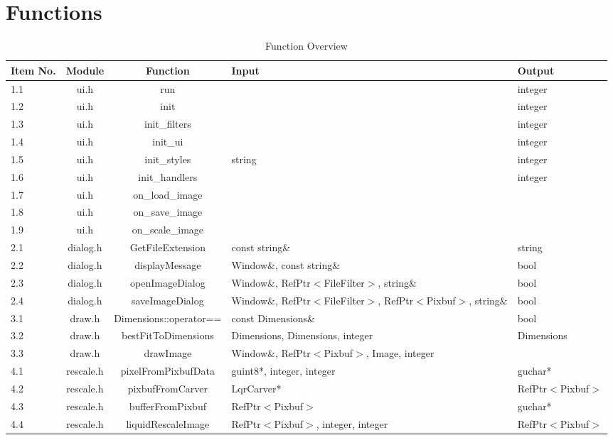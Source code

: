 \documentclass{article}
\begin{document}
\newpage

\section{Functions}

\begin{table}[h!]
    \centering
    \caption{Function Overview}
    \label{tab:funcs}
    \begin{tabular}{|p{}|c|c|p{}|p{}|}
        \hline
        \textbf{Item No.} & \textbf{Module} & \textbf{Function} & \textbf{Input} & \textbf{Output} \\
        \hline
        1.1 & ui.h & run & & integer \\
        \hline
        1.2 & ui.h & init & & integer \\
        \hline
        1.3 & ui.h & init\_filters & & integer \\
        \hline
        1.4 & ui.h & init\_ui & & integer \\
        \hline
        1.5 & ui.h & init\_styles & string & integer \\
        \hline
        1.6 & ui.h & init\_handlers & & integer \\
        \hline
        1.7 & ui.h & on\_load\_image & & \\
        \hline
        1.8 & ui.h & on\_save\_image & & \\
        \hline
        1.9 & ui.h & on\_scale\_image & & \\
        \hline
        2.1 & dialog.h & GetFileExtension & const string\& & string \\
        \hline
        2.2 & dialog.h & displayMessage & Window\&, const string\& & bool \\
        \hline
        2.3 & dialog.h & openImageDialog & Window\&, RefPtr$<$FileFilter$>$, string\& & bool \\
        \hline
        2.4 & dialog.h & saveImageDialog & Window\&, RefPtr$<$FileFilter$>$, RefPtr$<$Pixbuf$>$, string\& & bool \\
        \hline
        3.1 & draw.h & Dimensions::operator== & const Dimensions\& & bool \\
        \hline
        3.2 & draw.h & bestFitToDimensions & Dimensions, Dimensions, integer & Dimensions \\
        \hline
        3.3 & draw.h & drawImage & Window\&, RefPtr$<$Pixbuf$>$, Image, integer & \\
        \hline
        4.1 & rescale.h & pixelFromPixbufData & guint8*, integer, integer & guchar* \\
        \hline
        4.2 & rescale.h & pixbufFromCarver & LqrCarver* & RefPtr$<$Pixbuf$>$ \\
        \hline
        4.3 & rescale.h & bufferFromPixbuf & RefPtr$<$Pixbuf$>$ & guchar* \\
        \hline
        4.4 & rescale.h & liquidRescaleImage & RefPtr$<$Pixbuf$>$, integer, integer & RefPtr$<$Pixbuf$>$ \\
        \hline
    \end{tabular}
\end{table}
\end{document}
